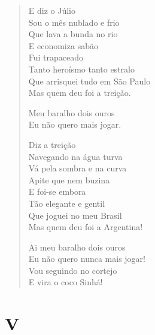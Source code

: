 \begin{verse}
E diz o Júlio\\
Sou o mês nublado e frio\\
Que lava a bunda no rio\\
E economiza sabão\\
Fui trapaceado\\
Tanto heroísmo tanto estralo\\
Que arrisquei tudo em São Paulo\\
Mas quem deu foi a treição.

\quad\quad\quad{}Meu baralho dois ouros\\
\quad\quad\quad{}Eu não quero mais jogar.

Diz a treição\\
Navegando na água turva\\
Vá pela sombra e na curva\\
Apite que nem buzina\\
E foi-se embora\\
Tão elegante e gentil\\
Que joguei no meu Brasil\\
Mas quem deu foi a Argentina!

\quad\quad\quad{}Ai meu baralho dois ouros\\
\quad\quad{}Eu não quero nunca mais jogar!\\
\quad{}Vou seguindo no cortejo\\
E vira o coco Sinhá!
\end{verse}

\pagebreak
\section{V}

